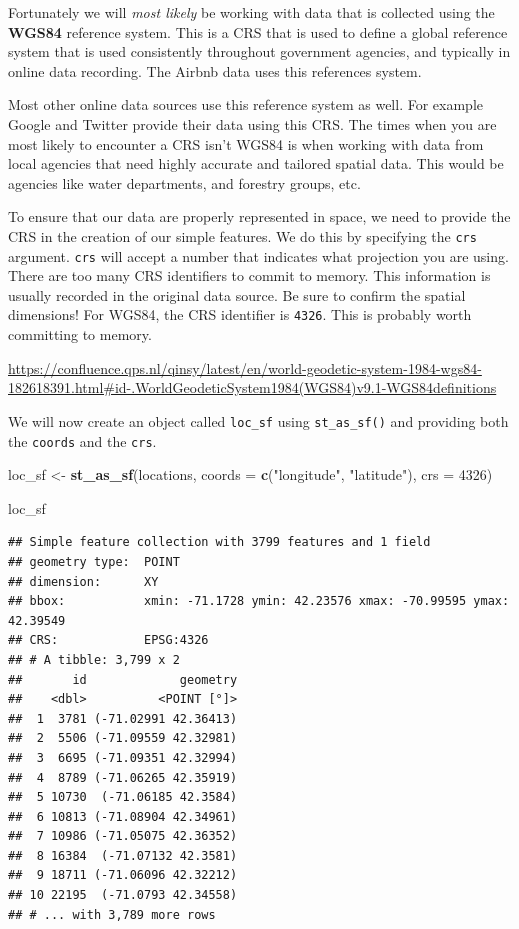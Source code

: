 \documentclass[
]{book}
\newenvironment{Shaded}{\begin{snugshade}}{\end{snugshade}}
\newcommand{\DataTypeTok}[1]{\textcolor[rgb]{0.13,0.29,0.53}{#1}}
\newcommand{\DecValTok}[1]{\textcolor[rgb]{0.00,0.00,0.81}{#1}}
\newcommand{\KeywordTok}[1]{\textcolor[rgb]{0.13,0.29,0.53}{\textbf{#1}}}
\newcommand{\NormalTok}[1]{#1}
\newcommand{\StringTok}[1]{\textcolor[rgb]{0.31,0.60,0.02}{#1}}
\begin{document}
Fortunately we will \emph{most likely} be working with data that is collected using the \textbf{WGS84} reference system. This is a CRS that is used to define a global reference system that is used consistently throughout government agencies, and typically in online data recording. The Airbnb data uses this references system.

Most other online data sources use this reference system as well. For example Google and Twitter provide their data using this CRS. The times when you are most likely to encounter a CRS isn't WGS84 is when working with data from local agencies that need highly accurate and tailored spatial data. This would be agencies like water departments, and forestry groups, etc.

To ensure that our data are properly represented in space, we need to provide the CRS in the creation of our simple features. We do this by specifying the \texttt{crs} argument. \texttt{crs} will accept a number that indicates what projection you are using. There are too many CRS identifiers to commit to memory. This information is usually recorded in the original data source. Be sure to confirm the spatial dimensions! For WGS84, the CRS identifier is \texttt{4326}. This is probably worth committing to memory.

\url{https://confluence.qps.nl/qinsy/latest/en/world-geodetic-system-1984-wgs84-182618391.html\#id-.WorldGeodeticSystem1984(WGS84)v9.1-WGS84definitions}

We will now create an object called \texttt{loc\_sf} using \texttt{st\_as\_sf()} and providing both the \texttt{coords} and the \texttt{crs}.

\begin{Shaded}
\begin{Highlighting}[]
\NormalTok{loc\_sf \textless{}{-}}\StringTok{ }\KeywordTok{st\_as\_sf}\NormalTok{(locations,}
         \DataTypeTok{coords =} \KeywordTok{c}\NormalTok{(}\StringTok{"longitude"}\NormalTok{, }\StringTok{"latitude"}\NormalTok{),}
         \DataTypeTok{crs =} \DecValTok{4326}\NormalTok{)}

\NormalTok{loc\_sf}
\end{Highlighting}
\end{Shaded}

\begin{verbatim}
## Simple feature collection with 3799 features and 1 field
## geometry type:  POINT
## dimension:      XY
## bbox:           xmin: -71.1728 ymin: 42.23576 xmax: -70.99595 ymax: 42.39549
## CRS:            EPSG:4326
## # A tibble: 3,799 x 2
##       id             geometry
##    <dbl>          <POINT [°]>
##  1  3781 (-71.02991 42.36413)
##  2  5506 (-71.09559 42.32981)
##  3  6695 (-71.09351 42.32994)
##  4  8789 (-71.06265 42.35919)
##  5 10730  (-71.06185 42.3584)
##  6 10813 (-71.08904 42.34961)
##  7 10986 (-71.05075 42.36352)
##  8 16384  (-71.07132 42.3581)
##  9 18711 (-71.06096 42.32212)
## 10 22195  (-71.0793 42.34558)
## # ... with 3,789 more rows
\end{verbatim}
\end{document}
